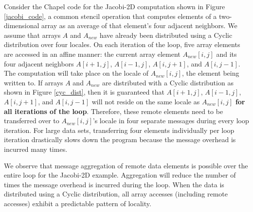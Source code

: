 Consider the Chapel code for the Jacobi-2D computation shown in Figure \ref{jacobi_code}, a common stencil operation that computes elements of a two-dimensional array as an average of that element's four adjacent neighbors. We assume that arrays $A$ and $A_{new}$ have already been distributed using a Cyclic distribution over four locales. On each iteration of the loop, five array elements are accessed in an affine manner: the current array element $A_{new}[i, j]$ and its four adjacent neighbors $A[i+1, j]$, $A[i-1, j]$, $A[i, j+1]$, and $A[i, j-1]$. The computation will take place on the locale of $A_{new}[i, j]$, the element being written to. If arrays $A$ and $A_{new}$ are distributed with a Cyclic distribution as shown in Figure \ref{cyc_dist}, then it is guaranteed that $A[i+1, j]$, $A[i-1, j]$, $A[i, j+1]$, and $A[i, j-1]$ will not reside on the same locale as $A_{new}[i, j]$ \textbf{for all iterations of the loop}. Therefore, these remote elements need to be transferred over to $A_{new}[i, j]$'s locale in four separate messages during every loop iteration. For large data sets, transferring four elements individually per loop iteration drastically slows down the program because the message overhead is incurred many times. 

We observe that message aggregation of remote data elements is possible over the entire loop for the Jacobi-2D example. Aggregation will reduce the number of times the message overhead is incurred during the loop. When the data is distributed using a Cyclic distribution, all array accesses (including remote accesses) exhibit a predictable pattern of locality. 

